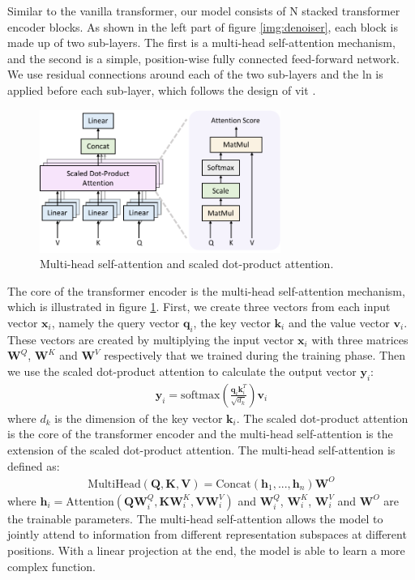 \documentclass[12pt,DIV14,BCOR12mm,a4paper,footinclude=false,headinclude,parskip=half-,twoside,openright,cleardoublepage=empty,toc=index,bibliography=totoc,listof=totoc]{scrreprt}
\numberwithin{equation}{chapter}
\begin{document}
Similar to the vanilla transformer, our model consists of N stacked transformer encoder blocks. As shown in the left part of figure \ref{img:denoiser}, each block is made up of two sub-layers. The first is a multi-head self-attention mechanism, and the second is a simple, position-wise fully connected feed-forward network. We use residual connections around each of the two sub-layers and the \gls{ln} is applied before each sub-layer, which follows the design of \gls{vit} \cite{dosovitskiy2021image}.
\begin{figure}[h]
	\centering
	\includegraphics[width=0.7\textwidth]{img/mhsa.pdf}
	\caption{Multi-head self-attention and scaled dot-product attention.}
	\label{img:mhsa}
\end{figure}

The core of the transformer encoder is the multi-head self-attention mechanism, which is illustrated in figure \ref{img:mhsa}. First, we create three vectors from each input vector $\mathbf{x}_{i}$, namely the query vector $\mathbf{q}_{i}$, the key vector $\mathbf{k}_{i}$ and the value vector $\mathbf{v}_{i}$. These vectors are created by multiplying the input vector $\mathbf{x}_{i}$ with three matrices $\mathbf{W}^{Q}$, $\mathbf{W}^{K}$ and $\mathbf{W}^{V}$ respectively that we trained during the training phase. Then we use the scaled dot-product attention to calculate the output vector $\mathbf{y}_{i}$:
\begin{align}
  \mathbf{y}_{i} = \text{softmax}\left(\frac{\mathbf{q}_{i}\mathbf{k}_{i}^{T}}{\sqrt{d_{k}}}\right)\mathbf{v}_{i}
\end{align}
where $d_{k}$ is the dimension of the key vector $\mathbf{k}_{i}$. The scaled dot-product attention is the core of the transformer encoder and the multi-head self-attention is the extension of the scaled dot-product attention. The multi-head self-attention is defined as:
\begin{align}
  \text{MultiHead}(\mathbf{Q}, \mathbf{K}, \mathbf{V}) = \text{Concat}(\mathbf{h}_{1},...,\mathbf{h}_{n})\mathbf{W}^{O}
\end{align}
where $\mathbf{h}_{i} = \text{Attention}(\mathbf{Q}\mathbf{W}_{i}^{Q}, \mathbf{K}\mathbf{W}_{i}^{K}, \mathbf{V}\mathbf{W}_{i}^{V})$ and $\mathbf{W}_{i}^{Q}$, $\mathbf{W}_{i}^{K}$, $\mathbf{W}_{i}^{V}$ and $\mathbf{W}^{O}$ are the trainable parameters. The multi-head self-attention allows the model to jointly attend to information from different representation subspaces at different positions. With a linear projection at the end, the model is able to learn a more complex function.
\end{document}
